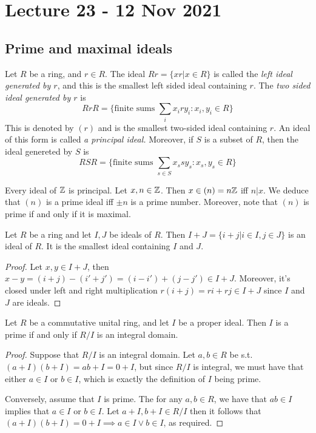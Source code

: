 \section{Lecture 23 - 12 Nov 2021}
\subsection{Prime and maximal ideals}
\begin{definition}
  Let $R$ be a ring, and $r\in R$. The ideal $Rr=\{xr | x\in R\}$ is called the \emph{left
  ideal generated by $r$}, and this is the smallest left sided ideal containing $r$. The
  \emph{two sided ideal generated by $r$} is
  \[RrR= \{\text{finite sums }\sum_i x_i r y_i : x_i,y_i\in R\}\]
  This is denoted by $(r)$ and is the smallest two-sided ideal containing $r$. An ideal of
  this form is called \emph{a principal ideal.} Moreover, if $S$ is a subset of $R$, then
  the ideal genereted by $S$ is
  \[RSR = \{\text{finite sums }\sum_{s\in S} x_s s y_s : x_s,y_s\in R \}\]

  \label{<+label+>}
\end{definition}

\begin{example}
  Every ideal of $\mathbb Z$ is principal. Let $x,n\in \mathbb Z$. Then $x\in(n)=n\mathbb Z$ iff $n|x$. We
  deduce that $(n)$ is a prime ideal iff $\pm n$ is a prime number. Moreover, note that
  $(n)$ is prime if and only if it is maximal.
\end{example}

\begin{theorem}
  Let $R$ be a ring and let $I,J$ be ideals of $R$. Then $I+J=\{i+j|i\in I, j\in J\}$ is
  an ideal of $R$. It is the smallest ideal containing $I$ and $J$.
  \label{<+label+>}
\end{theorem}
\begin{proof}
  Let $x,y\in I+J$, then $x-y=(i+j)-(i'+j')=(i-i')+(j-j')\in I+J$. Moreover, it's closed
  under left and right multiplication $r(i+j)=ri+rj\in I+J$ since $I$ and $J$ are ideals.
\end{proof}

\begin{theorem}
  Let $R$ be a commutative unital ring, and let $I$ be a proper ideal. Then $I$ is a prime
  if and only if $R/I$ is an integral domain.
  \label{<+label+>}
\end{theorem}
\begin{proof}
  Suppose that $R/I$ is an integral domain. Let $a,b\in R$ be s.t. $(a+I)(b+I)=ab+I=0+I$,
  but since $R/I$ is integral, we must have that either $a\in I$ or $b\in I$, which is
  exactly the definition of $I$ being prime.

  Conversely, assume that $I$ is prime. The for any $a,b\in R$, we have that $ab\in I$
  implies that $a\in I$ or $b\in I$. Let $a+I, b+I\in R/I$ then it follows that
  $(a+I)(b+I)=0+I \implies a\in I \lor b\in I$, as required.
\end{proof}

